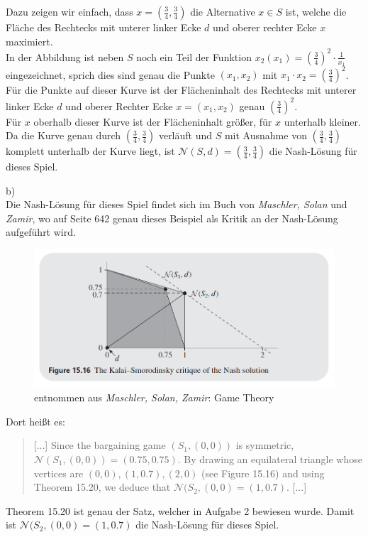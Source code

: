 \documentclass{scrartcl}
\begin{document}
Dazu zeigen wir einfach, dass $x =(\frac{3}{4}, \frac{3}{4})$ die Alternative $x \in S$ ist, welche die Fläche
des Rechtecks mit unterer linker Ecke $d$ und oberer rechter Ecke $x$ maximiert. \\

In der Abbildung ist neben $S$ noch ein Teil der Funktion $x_2(x_1) = (\frac{3}{4})^2 \cdot \frac{1}{x_1}$
eingezeichnet, sprich dies sind genau die Punkte $(x_1, x_2)$ mit $x_1 \cdot x_2 = (\frac{3}{4})^2$. Für die
Punkte auf dieser Kurve ist der Flächeninhalt des Rechtecks mit unterer linker Ecke $d$ und oberer Rechter
Ecke $x = (x_1, x_2)$ genau $(\frac{3}{4})^2$. \\

Für $x$ oberhalb dieser Kurve ist der Flächeninhalt größer, für $x$ unterhalb kleiner. Da die Kurve genau durch
$(\frac{3}{4}, \frac{3}{4})$ verläuft und $S$ mit Ausnahme von $(\frac{3}{4}, \frac{3}{4})$ komplett unterhalb der
Kurve liegt, ist $\mathcal{N}(S, d) = (\frac{3}{4}, \frac{3}{4})$ die Nash-Lösung für dieses Spiel. \clearpage

b) \\

Die Nash-Lösung für dieses Spiel findet sich im Buch von \textsl{Maschler, Solan} und \textsl{Zamir}, wo auf
Seite 642 genau dieses Beispiel als Kritik an der Nash-Lösung aufgeführt wird. \\

\begin{figure}[h!]
\includegraphics[width=1\textwidth]{3b.png}
\caption{entnommen aus \textsl{Maschler, Solan, Zamir}: Game Theory}
\end{figure}

Dort heißt es:
\begin{quotation}
[...] Since the bargaining game $(S_1,(0,0))$ is symmetric, $\mathcal{N}(S_1,(0,0)) = (0.75, 0.75)$. By
drawing an equilateral triangle whose vertices are $(0,0), (1,0.7), (2,0)$ (see Figure 15.16) and
using Theorem 15.20, we deduce that $\mathcal{N}(S_2,(0,0) = (1,0.7)$. [...]
\end{quotation}

Theorem 15.20 ist genau der Satz, welcher in Aufgabe 2 bewiesen wurde. Damit ist $\mathcal{N}(S_2,
(0,0) = (1,0.7)$ die Nash-Lösung für dieses Spiel.
\end{document}
